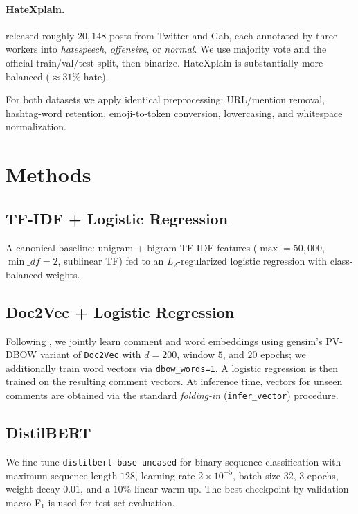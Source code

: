 \documentclass[11pt]{article}
\begin{document}
\paragraph{HateXplain.} \citet{mathew2021hatexplain} released roughly
$20{,}148$ posts from Twitter and Gab, each annotated by three workers into
\textit{hatespeech}, \textit{offensive}, or \textit{normal}. We use majority
vote and the official train/val/test split, then binarize. HateXplain is
substantially more balanced ($\approx 31\%$ hate).

For both datasets we apply identical preprocessing: URL/mention removal,
hashtag-word retention, emoji-to-token conversion, lowercasing, and
whitespace normalization.

\section{Methods}

\subsection{TF-IDF + Logistic Regression}
A canonical baseline: unigram + bigram TF-IDF features
($\max=50{,}000$, $\min\_df=2$, sublinear TF) fed to an $L_2$-regularized
logistic regression with class-balanced weights.

\subsection{Doc2Vec + Logistic Regression}
Following \citet{djuric2015hate}, we jointly learn comment and word
embeddings using gensim's PV-DBOW variant of \texttt{Doc2Vec}
\citep{le2014distributed} with $d=200$, window $5$, and $20$ epochs; we
additionally train word vectors via \texttt{dbow\_words=1}. A logistic
regression is then trained on the resulting comment vectors. At inference
time, vectors for unseen comments are obtained via the standard
\emph{folding-in} (\texttt{infer\_vector}) procedure.

\subsection{DistilBERT}
We fine-tune \texttt{distilbert-base-uncased} \citep{sanh2019distilbert} for
binary sequence classification with maximum sequence length $128$, learning
rate $2{\times}10^{-5}$, batch size $32$, $3$ epochs, weight decay $0.01$,
and a $10\%$ linear warm-up. The best checkpoint by validation macro-F$_1$
is used for test-set evaluation.
\end{document}

